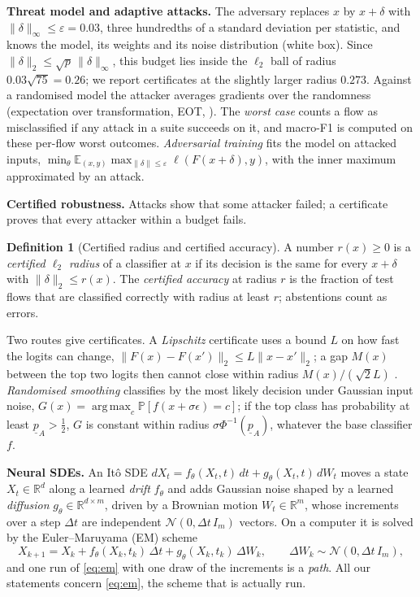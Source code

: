 \documentclass{article}
\theoremstyle{definition}
\newtheorem{definition}{Definition}
\newcommand{\Real}{\mathbb{R}}
\newcommand{\Exp}{\mathbb{E}}
\newcommand{\Prob}{\mathbb{P}}
\DeclareMathOperator*{\argmax}{arg\,max}
\begin{document}
\textbf{Threat model and adaptive attacks.} The adversary replaces $x$ by
$x+\delta$ with $\|\delta\|_\infty\le\varepsilon=0.03$, three hundredths of a
standard deviation per statistic, and knows the model, its weights and its
noise distribution (white box). Since $\|\delta\|_2\le\sqrt{p}\,\|\delta\|_\infty$,
this budget lies inside the $\ell_2$ ball of radius $0.03\sqrt{75}=0.26$; we
report certificates at the slightly larger radius $0.273$. Against a randomised
model the attacker averages gradients over the randomness (expectation over
transformation, EOT, \citealp{athalye2018obfuscated}). The \emph{worst case}
counts a flow as misclassified if any attack in a suite succeeds on it, and
macro-F1 is computed on these per-flow worst outcomes. \emph{Adversarial
training} \citep{madry2018pgd} fits the model on attacked inputs,
$\min_\theta\Exp_{(x,y)}\max_{\|\delta\|\le\varepsilon}\ell(F(x+\delta),y)$, with
the inner maximum approximated by an attack.

\textbf{Certified robustness.} Attacks show that some attacker failed; a
certificate proves that every attacker within a budget fails.

\begin{definition}[Certified radius and certified accuracy]\label{def:cert}
A number $r(x)\ge0$ is a \emph{certified $\ell_2$ radius} of a classifier at $x$
if its decision is the same for every $x+\delta$ with $\|\delta\|_2\le r(x)$. The
\emph{certified accuracy} at radius $r$ is the fraction of test flows that are
classified correctly with radius at least $r$; abstentions count as errors.
\end{definition}

Two routes give certificates. A \emph{Lipschitz} certificate uses a bound $L$
on how fast the logits can change, $\|F(x)-F(x')\|_2\le L\|x-x'\|_2$; a gap $M(x)$
between the top two logits then cannot close within radius $M(x)/(\sqrt2L)$
\citep{tsuzuku2018lipschitz}. \emph{Randomised smoothing}
\citep{cohen2019smoothing} classifies by the most likely decision under Gaussian
input noise, $G(x)=\argmax_c\Prob[f(x+\sigma\epsilon)=c]$; if the top class has
probability at least $\underline p_A>\tfrac12$, $G$ is constant within radius
$\sigma\Phi^{-1}(\underline p_A)$, whatever the base classifier $f$.

\textbf{Neural SDEs.} An It\^o SDE
$dX_t=f_\theta(X_t,t)\,dt+g_\theta(X_t,t)\,dW_t$ moves a state $X_t\in\Real^d$
along a learned \emph{drift} $f_\theta$ and adds Gaussian noise shaped by a
learned \emph{diffusion} $g_\theta\in\Real^{d\times m}$, driven by a Brownian
motion $W_t\in\Real^m$, whose increments over a step $\Delta t$ are independent
$\mathcal N(0,\Delta t\,I_m)$ vectors. On a computer it is solved by the
Euler--Maruyama (EM) scheme
\begin{equation}\label{eq:em}
  X_{k+1}=X_k+f_\theta(X_k,t_k)\,\Delta t+g_\theta(X_k,t_k)\,\Delta W_k,\qquad
  \Delta W_k\sim\mathcal N(0,\Delta t\,I_m),
\end{equation}
and one run of \eqref{eq:em} with one draw of the increments is a \emph{path}.
All our statements concern \eqref{eq:em}, the scheme that is actually run.
\end{document}
